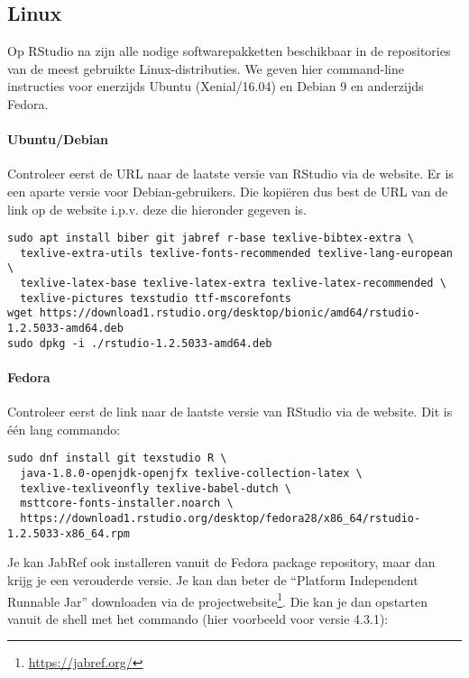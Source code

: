 \subsection{Linux}
\label{ssec:installatie-linux}

Op RStudio na zijn alle nodige softwarepakketten beschikbaar in de repositories van de meest gebruikte Linux-distributies. We geven hier command-line instructies voor enerzijds Ubuntu (Xenial/16.04) en Debian 9 en anderzijds Fedora.

\paragraph{Ubuntu/Debian} 

Controleer eerst de URL naar de laatste versie van RStudio via de website. Er is een aparte versie voor Debian-gebruikers. Die kopiëren dus best de URL van de link op de website i.p.v. deze die hieronder gegeven is.

\begin{verbatim}
sudo apt install biber git jabref r-base texlive-bibtex-extra \
  texlive-extra-utils texlive-fonts-recommended texlive-lang-european \
  texlive-latex-base texlive-latex-extra texlive-latex-recommended \
  texlive-pictures texstudio ttf-mscorefonts
wget https://download1.rstudio.org/desktop/bionic/amd64/rstudio-1.2.5033-amd64.deb
sudo dpkg -i ./rstudio-1.2.5033-amd64.deb
\end{verbatim}

\paragraph{Fedora}

Controleer eerst de link naar de laatste versie van RStudio via de website. Dit is één lang commando:

\begin{verbatim}
sudo dnf install git texstudio R \
  java-1.8.0-openjdk-openjfx texlive-collection-latex \
  texlive-texliveonfly texlive-babel-dutch \
  msttcore-fonts-installer.noarch \
  https://download1.rstudio.org/desktop/fedora28/x86_64/rstudio-1.2.5033-x86_64.rpm
\end{verbatim}

Je kan JabRef ook installeren vanuit de Fedora package repository, maar dan krijg je een verouderde versie. Je kan dan beter de ``Platform Independent Runnable Jar'' downloaden via de projectwebsite\footnote{\url{https://jabref.org/}}. Die kan je dan opstarten vanuit de shell met het commando (hier voorbeeld voor versie 4.3.1):

